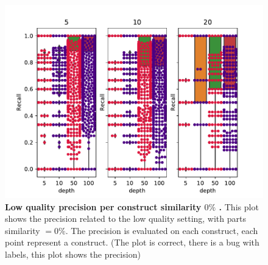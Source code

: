 \documentclass[11pt, a4paper]{article}
\begin{document}
 \begin{figure}[ht]
    \begin{center}
    \includegraphics[width=1.35\textwidth]{../results/images_notebook/v_460/lq_sim_00_precision_per_construct.pdf}
    \end{center}
    \caption{{\bf Low quality precision per construct similarity $0\%$ .}  This plot shows the precision related to the low quality setting, with parts similarity $=0\%$. The precision is evaluated on each construct, each point represent a construct. (The plot is correct, there is a bug with labels, this plot shows the precision)}
   \label{fig:v_460_lq_sim_00_precision_per_construct}
\end{figure}
\end{document}
